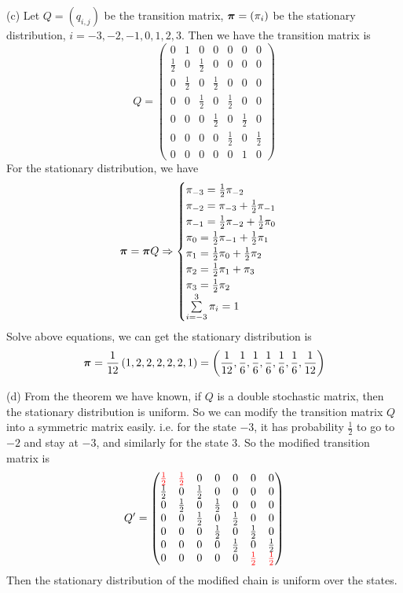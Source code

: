 \begin{homeworkProblem}
(c) Let $Q=(q_{i,j})$ be the transition matrix, $\boldsymbol{\pi}=(\pi_i)$ be the stationary distribution, $i=-3,-2,-1,0,1,2,3$. Then we have the transition matrix is
$$Q=\begin{pmatrix}
0 & 1 & 0 & 0 & 0 & 0 & 0 \\
\frac{1}{2} & 0 & \frac{1}{2} & 0 & 0 & 0 & 0 \\
0 & \frac{1}{2} & 0 & \frac{1}{2} & 0 & 0 & 0 \\
0 & 0 & \frac{1}{2} & 0 & \frac{1}{2} & 0 & 0 \\
0 & 0 & 0 & \frac{1}{2} & 0 & \frac{1}{2} & 0 \\
0 & 0 & 0 & 0 & \frac{1}{2} & 0 & \frac{1}{2} \\
0 & 0 & 0 & 0 & 0 & 1 & 0
\end{pmatrix}$$
For the stationary distribution, we have
$$\boldsymbol{\pi} = \boldsymbol{\pi} Q \Rightarrow \begin{cases}
\pi_{-3} = \frac{1}{2}\pi_{-2} \\
\pi_{-2} = \pi_{-3} + \frac{1}{2}\pi_{-1} \\
\pi_{-1} = \frac{1}{2}\pi_{-2} + \frac{1}{2}\pi_{0} \\
\pi_{0} = \frac{1}{2}\pi_{-1} + \frac{1}{2}\pi_{1} \\
\pi_{1} = \frac{1}{2}\pi_{0} + \frac{1}{2}\pi_{2} \\
\pi_{2} = \frac{1}{2}\pi_{1} + \pi_{3} \\
\pi_{3} = \frac{1}{2}\pi_{2} \\
\sum\limits_{i=-3}^{3}\pi_i = 1
\end{cases}$$
Solve above equations, we can get the stationary distribution is
$$\boldsymbol{\pi} = \dfrac{1}{12}\left(1,2,2,2,2,2,1\right)=\left(\frac{1}{12},\frac{1}{6},\frac{1}{6},\frac{1}{6},\frac{1}{6},\frac{1}{6},\frac{1}{12}\right)$$

(d) From the theorem we have known, if $Q$ is a double stochastic matrix, then the stationary distribution is uniform. So we can modify the transition matrix $Q$ into a symmetric matrix easily. i.e. for the state $-3$, it has probability $\frac{1}{2}$ to go to $-2$ and stay at $-3$, and similarly for the state $3$. So the modified transition matrix is
$$Q'=\begin{pmatrix}
\textcolor{red}{\frac{1}{2}} & \textcolor{red}{\frac{1}{2}} & 0 & 0 & 0 & 0 & 0 \\
\frac{1}{2} & 0 & \frac{1}{2} & 0 & 0 & 0 & 0 \\
0 & \frac{1}{2} & 0 & \frac{1}{2} & 0 & 0 & 0 \\
0 & 0 & \frac{1}{2} & 0 & \frac{1}{2} & 0 & 0 \\
0 & 0 & 0 & \frac{1}{2} & 0 & \frac{1}{2} & 0 \\
0 & 0 & 0 & 0 & \frac{1}{2} & 0 & \frac{1}{2} \\
0 & 0 & 0 & 0 & 0 & \textcolor{red}{\frac{1}{2}} & \textcolor{red}{\frac{1}{2}}
\end{pmatrix}$$
Then the stationary distribution of the modified chain is uniform over the states.

\end{homeworkProblem}

\newpage